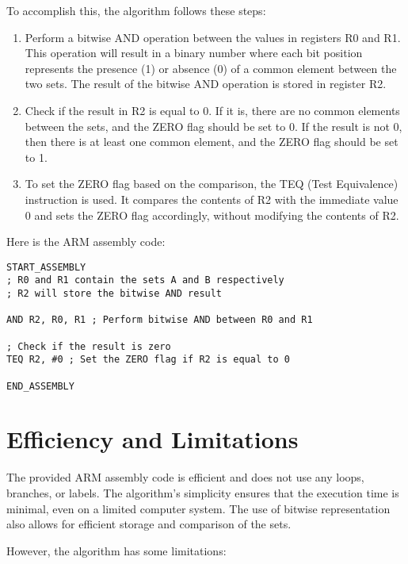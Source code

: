 To accomplish this, the algorithm follows these steps:

\begin{enumerate}
\item Perform a bitwise AND operation between the values in registers R0 and R1. This operation will result in a binary number where each bit position represents the presence (1) or absence (0) of a common element between the two sets. The result of the bitwise AND operation is stored in register R2.

\item Check if the result in R2 is equal to 0. If it is, there are no common elements between the sets, and the ZERO flag should be set to 0. If the result is not 0, then there is at least one common element, and the ZERO flag should be set to 1.

\item To set the ZERO flag based on the comparison, the TEQ (Test Equivalence) instruction is used. It compares the contents of R2 with the immediate value 0 and sets the ZERO flag accordingly, without modifying the contents of R2.

\end{enumerate}

Here is the ARM assembly code:

\begin{verbatim}
START_ASSEMBLY
; R0 and R1 contain the sets A and B respectively
; R2 will store the bitwise AND result

AND R2, R0, R1 ; Perform bitwise AND between R0 and R1

; Check if the result is zero
TEQ R2, #0 ; Set the ZERO flag if R2 is equal to 0

END_ASSEMBLY
\end{verbatim}

\section{Efficiency and Limitations}
The provided ARM assembly code is efficient and does not use any loops, branches, or labels. The algorithm's simplicity ensures that the execution time is minimal, even on a limited computer system. The use of bitwise representation also allows for efficient storage and comparison of the sets.

However, the algorithm has some limitations:


